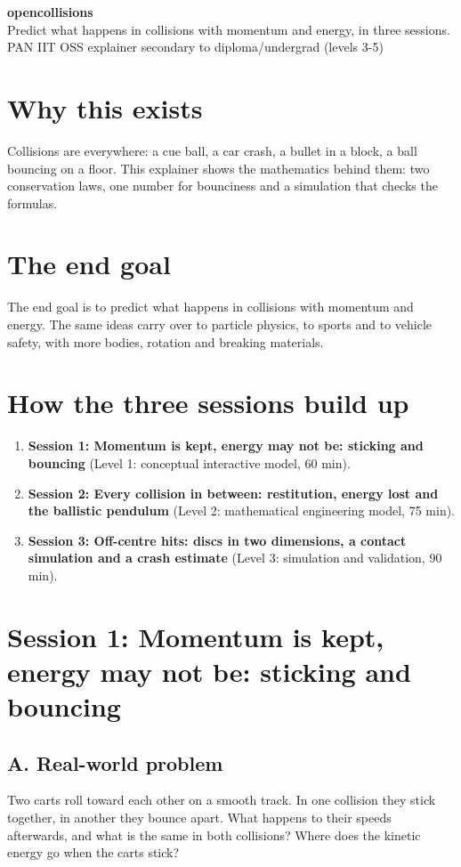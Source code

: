 \documentclass[11pt,a4paper]{article}
\begin{document}
\begin{center}{\LARGE\bfseries opencollisions}\\[0.4em]{\large Predict what happens in collisions with momentum and energy, in three sessions.}\\[0.2em]\small PAN IIT OSS explainer \textbullet{} secondary to diploma/undergrad (levels 3-5)\end{center}

\section*{Why this exists}
Collisions are everywhere: a cue ball, a car crash, a bullet in a block, a ball bouncing on a floor. This explainer shows the mathematics behind them: two conservation laws, one number for bounciness and a simulation that checks the formulas.

\section*{The end goal}
The end goal is to predict what happens in collisions with momentum and energy. The same ideas carry over to particle physics, to sports and to vehicle safety, with more bodies, rotation and breaking materials.

\section*{How the three sessions build up}
\begin{enumerate}[nosep]
\item \textbf{Session 1: Momentum is kept, energy may not be: sticking and bouncing} (Level 1: conceptual interactive model, 60 min).
\item \textbf{Session 2: Every collision in between: restitution, energy lost and the ballistic pendulum} (Level 2: mathematical engineering model, 75 min).
\item \textbf{Session 3: Off-centre hits: discs in two dimensions, a contact simulation and a crash estimate} (Level 3: simulation and validation, 90 min).
\end{enumerate}

\section{Session 1: Momentum is kept, energy may not be: sticking and bouncing}

\subsection*{A. Real-world problem}
Two carts roll toward each other on a smooth track. In one collision they stick together, in another they bounce apart. What happens to their speeds afterwards, and what is the same in both collisions? Where does the kinetic energy go when the carts stick?
\end{document}
